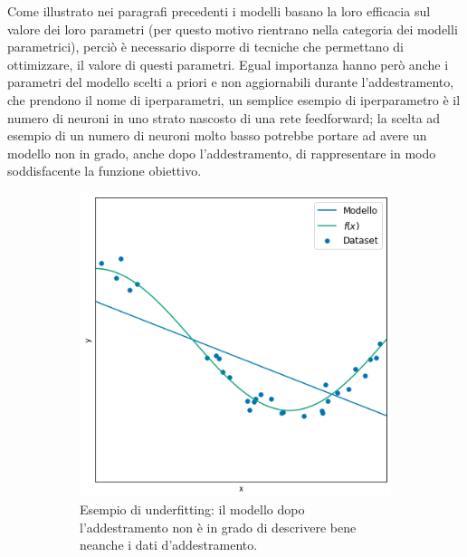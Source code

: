 \documentclass[../../main.tex]{subfiles}
\begin{document}
Come illustrato nei paragrafi precedenti i modelli basano la loro efficacia sul valore dei loro parametri (per questo motivo rientrano nella categoria dei modelli parametrici), perciò è necessario disporre di tecniche che permettano di ottimizzare, il valore di questi parametri. Egual importanza hanno però anche i parametri del modello scelti a priori e non aggiornabili durante l'addestramento, che prendono il nome di iperparametri, un semplice esempio di iperparametro è il numero di neuroni in uno strato nascosto di una rete feedforward; la scelta ad esempio di un numero di neuroni molto basso potrebbe portare ad avere un modello non in grado, anche dopo l'addestramento, di rappresentare in modo soddisfacente la funzione obiettivo.

\begin{figure}[H]
    \centering
    \begin{subfigure}[t]{0.30\textwidth}
        \centering
        \includegraphics[width=\textwidth]{immagini/4_2/4_2_3/under.png}
        \caption{Esempio di underfitting: il modello dopo l'addestramento non è in grado di descrivere bene neanche i dati d'addestramento.}
        \label{fig:underfitting}
    \end{subfigure}
    \begin{subfigure}[t]{0.30\textwidth}
        \centering

\end{subfigure}
\end{figure}
\end{document}
